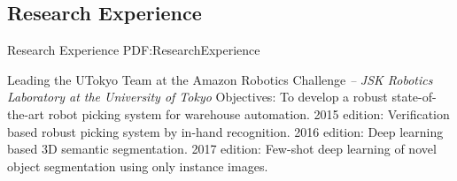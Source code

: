 \documentclass[letterpaper,MMMyyyy,nonstop]{simpleresumecv}
\begin{document}
\begin{body}
%
%


\section
{Research Experience}
{Research Experience}
{PDF:ResearchExperience}

Leading the UTokyo Team at the Amazon Robotics Challenge
\hfill
\textit{ -- }
\newline
\textit{JSK Robotics Laboratory at the University of Tokyo}
\BulletItem
Objectives: To develop a robust state-of-the-art robot picking system for warehouse automation.
2015 edition: Verification based robust picking system by in-hand recognition.
2016 edition: Deep learning based 3D semantic segmentation.
2017 edition: Few-shot deep learning of novel object segmentation using only instance images.




\end{body}
\end{document}
